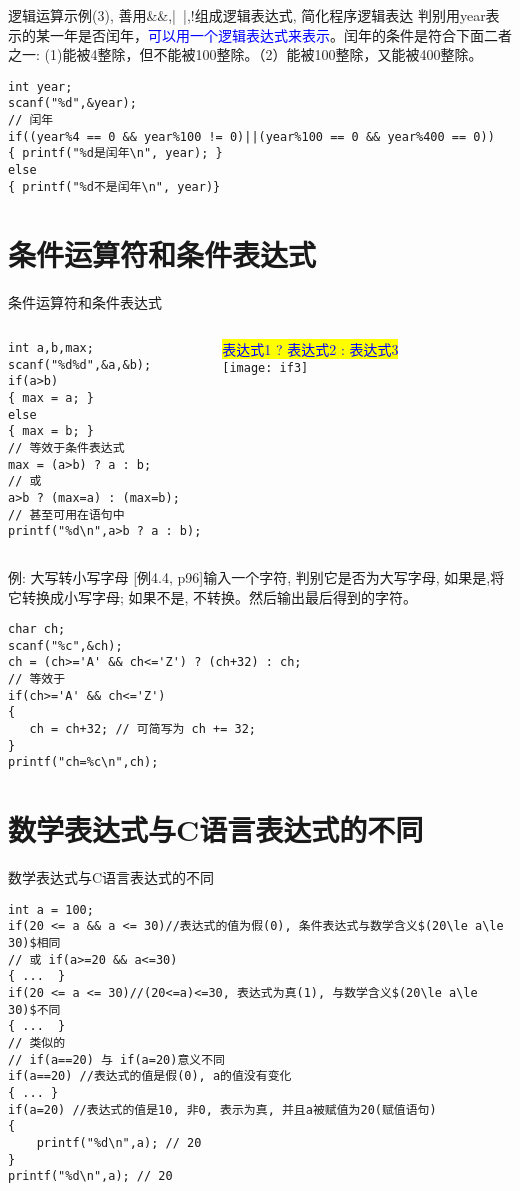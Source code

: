 \begin{frame}{逻辑运算示例(3), 善用\&\&,|~|,!组成逻辑表达式, 简化程序逻辑表达}
判别用year表示的某一年是否闰年，\textcolor{blue}{可以用一个逻辑表达式来表示}。闰年的条件是符合下面二者之一: (1)能被4整除，但不能被100整除。（2）能被100整除，又能被400整除。
\begin{lstlisting}
int year;
scanf("%d",&year);
// 闰年
if((year%4 == 0 && year%100 != 0)||(year%100 == 0 && year%400 == 0))
{ printf("%d是闰年\n", year); }
else
{ printf("%d不是闰年\n", year)}
\end{lstlisting}
\end{frame}

\section{条件运算符和条件表达式}

\begin{frame}{条件运算符和条件表达式}
\begin{columns}[T]
\begin{lstlisting}
int a,b,max;
scanf("%d%d",&a,&b);
if(a>b)
{ max = a; }
else
{ max = b; }
// 等效于条件表达式
max = (a>b) ? a : b;
// 或
a>b ? (max=a) : (max=b);
// 甚至可用在语句中
printf("%d\n",a>b ? a : b);
\end{lstlisting}
\colorbox{yellow}{\textcolor{blue}{表达式1 ? 表达式2 : 表达式3}}\\
\texttt{[image: if3]}
\end{columns}
\end{frame}

\begin{frame}{例: 大写转小写字母}
[例4.4, p96]输入一个字符, 判别它是否为大写字母, 如果是,将它转换成小写字母; 如果不是, 不转换。然后输出最后得到的字符。
\begin{lstlisting}
char ch;
scanf("%c",&ch);
ch = (ch>='A' && ch<='Z') ? (ch+32) : ch;
// 等效于
if(ch>='A' && ch<='Z')
{
   ch = ch+32; // 可简写为 ch += 32;
}
printf("ch=%c\n",ch);
\end{lstlisting}
\end{frame}

\section{数学表达式与C语言表达式的不同}

\begin{frame}{数学表达式与C语言表达式的不同}
\vspace{-0.3cm}
\begin{lstlisting}
int a = 100;
if(20 <= a && a <= 30)//表达式的值为假(0), 条件表达式与数学含义$(20\le a\le 30)$相同
// 或 if(a>=20 && a<=30)
{ ...  }
if(20 <= a <= 30)//(20<=a)<=30, 表达式为真(1), 与数学含义$(20\le a\le 30)$不同
{ ...  }
// 类似的
// if(a==20) 与 if(a=20)意义不同
if(a==20) //表达式的值是假(0), a的值没有变化
{ ... }
if(a=20) //表达式的值是10, 非0, 表示为真, 并且a被赋值为20(赋值语句)
{
    printf("%d\n",a); // 20 
}
printf("%d\n",a); // 20 
\end{lstlisting}
\end{frame}

